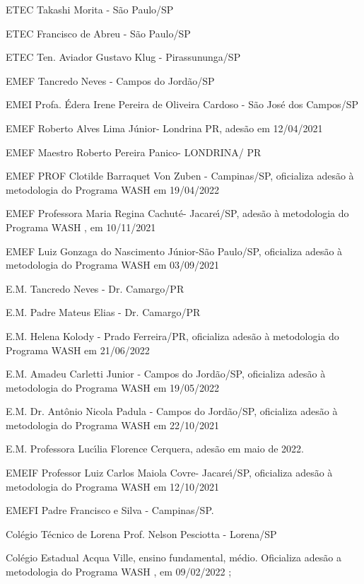 \documentclass[
12pt,		%
openright,	%
twoside,  %
a4paper,			%
chapter=TITLE,		%
english,			%
french,				%
spanish,			%
brazil				%
]{USPSC-classe/USPSC}
\begin{document}
\begin{alineas}
\item ETEC Takashi Morita - S\~ao Paulo/SP
\item ETEC Francisco de Abreu - S\~ao Paulo/SP
\item ETEC Ten. Aviador Gustavo Klug - Pirassununga/SP
\item EMEF Tancredo Neves - Campos do Jord\~ao/SP
\item EMEI Profa. \'Edera Irene Pereira de Oliveira Cardoso - S\~ao Jos\'e dos Campos/SP
\item EMEF Roberto Alves Lima J\'unior- Londrina PR, ades\~ao em 12/04/2021
\item EMEF Maestro Roberto Pereira Panico- LONDRINA/ PR
\item EMEF PROF Clotilde Barraquet Von Zuben - Campinas/SP, oficializa ades\~ao \`a metodologia do Programa WASH em 19/04/2022
\item EMEF Professora Maria Regina Cachut\'e- Jacare\'{\i}/SP, ades\~ao \`a metodologia do Programa WASH , em 10/11/2021
\item EMEF Luiz Gonzaga do Nascimento J\'unior-S\~ao Paulo/SP, oficializa ades\~ao \`a metodologia do Programa WASH em 03/09/2021
\item E.M. Tancredo Neves - Dr. Camargo/PR
\item E.M. Padre Mateus Elias - Dr. Camargo/PR
\item E.M. Helena Kolody - Prado Ferreira/PR, oficializa ades\~ao \`a metodologia do Programa WASH em 21/06/2022
\item E.M. Amadeu Carletti Junior - Campos do Jord\~ao/SP, oficializa ades\~ao \`a metodologia do Programa WASH em 19/05/2022
\item E.M. Dr. Ant\^onio Nicola Padula - Campos do Jord\~ao/SP, oficializa ades\~ao \`a metodologia do Programa WASH  em 22/10/2021
\item E.M. Professora Luc\'{\i}lia Florence Cerquera, ades\~ao em maio de 2022.
\item EMEIF Professor Luiz Carlos Maiola Covre- Jacare\'{\i}/SP, oficializa ades\~ao \`a metodologia do Programa WASH em 12/10/2021
\item EMEFI Padre Francisco e Silva - Campinas/SP. 
\item Col\'egio T\'ecnico de Lorena Prof. Nelson Pesciotta - Lorena/SP
\item Col\'egio  Estadual Acqua Ville, ensino fundamental, m\'edio.  Oficializa ades\~ao a metodologia do Programa WASH , em 09/02/2022 ;
\end{alineas}
\end{document}

